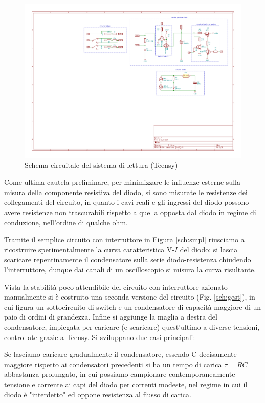 \documentclass{article}[a4paper, oneside, 11pt]
\begin{document}
\begin{figure}[!htb]
	\centering 
 		\includegraphics[scale=2.2]{./measure.pdf}
 	\caption{Schema circuitale del sistema di lettura (Teensy) \label{sch:rdng}}
\end{figure}
Come ultima cautela preliminare, per minimizzare le influenze esterne sulla misura della componente resistiva del diodo, si sono misurate le resistenze dei collegamenti del circuito, in quanto i cavi reali e gli ingressi del diodo possono avere resistenze non trascurabili rispetto a quella opposta dal diodo in regime di conduzione, nell'ordine di qualche ohm.

Tramite il semplice circuito con interruttore in Figura \ref{sch:smpl} riusciamo a ricostruire sperimentalmente la curva caratteristica V-$I$ del diodo: si lascia scaricare repentinamente il condensatore sulla serie diodo-resistenza chiudendo l'interruttore, dunque dai canali di un oscilloscopio si misura la curva risultante.

Vista la stabilità poco attendibile del circuito con interruttore azionato manualmente si è costruito una seconda versione del circuito (Fig. \ref{sch:gest}), in cui figura un sottocircuito di switch e un condensatore di capacità maggiore di un paio di ordini di grandezza. Infine si aggiunge la maglia a destra del condensatore, impiegata per caricare (e scaricare) quest'ultimo a diverse tensioni, controllate grazie a Teensy.
Si sviluppano due casi principali:

Se lasciamo caricare gradualmente il condensatore, essendo C decisamente maggiore rispetto ai condensatori precedenti si ha un tempo di carica $\tau = RC$ abbastanza prolungato, in cui possiamo campionare contemporaneamente tensione e corrente ai capi del diodo per correnti modeste, nel regime in cui il diodo è "interdetto" ed oppone resistenza al flusso di carica.
\end{document}
